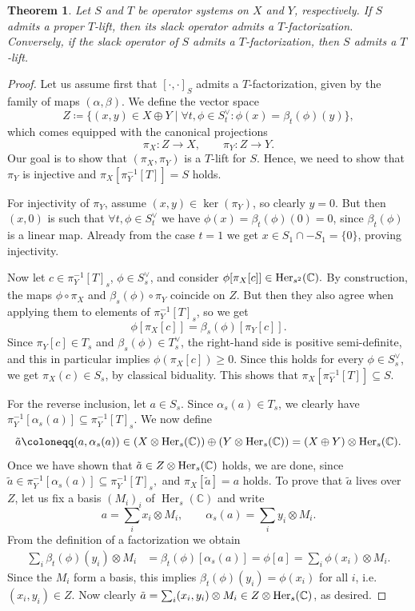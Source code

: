 \documentclass[11pt,onecolumn]{article}
\theoremstyle{plain}
\newtheorem{theorem}{Theorem}[section]
\theoremstyle{definition}
\newcommand{\C}{\mathbb{C}}
\begin{document}
\begin{theorem} \label{thm:NC_lift_iff_fact}
	Let \(S\) and \(T\) be operator systems on \(X\) and \(Y\), respectively. If \(S\) admits a proper \(T\)-lift, then its slack operator  admits a \(T\)-factorization. Conversely, if the slack operator of $S$ admits a \(T\)-factorization, then \(S\) admits a  \(T\)-lift.
\end{theorem}
\begin{proof}
	Let us assume first that \([\cdot,\cdot]_S\) admits a \(T\)-factorization, given by the family of maps \((\alpha, \beta)\). We define the vector space \[Z \coloneqq \lbrace (x, y) \in X \oplus Y \mid \forall t, \phi \in S^\lor_t\colon \phi(x) = \beta_t(\phi)(y) \rbrace,\] which comes equipped with the canonical projections \[\pi_X\colon Z \to X, \qquad \pi_Y\colon Z \to Y.\] Our goal is to show that \((\pi_X, \pi_Y)\) is a \(T\)-lift for \(S\). Hence, we need to show that $\pi_Y$ is injective and \(\pi_X[\pi_Y^{-1}[T]] = S\) holds. 

   For injectivity of $\pi_Y$, assume \((x, y) \in \operatorname{ker}(\pi_Y)\), so clearly \(y = 0\). But then \((x, 0)\) is such that \(\forall t, \phi \in S^\lor_t\) we have \(\phi(x) = \beta_t(\phi)(0) = 0\), since \(\beta_t(\phi)\) is a linear map. Already from the case $t=1$ we get  $x\in S_1\cap -S_1=\{0\}$, proving injectivity. 
	
    Now let \(c \in \pi_Y^{-1}[T]_s\), \(\phi \in S^\lor_s\), and consider \(\phi[\pi_X[c]]\in{\rm Her}_{s^2}(\C).\) By construction, the maps \(\phi \circ \pi_X\) and \(\beta_s(\phi) \circ \pi_Y\) coincide on \(Z\). But then they  also agree when applying them to elements of \(\pi_Y^{-1}[T]_s\), so we get \[\phi[\pi_X[c]] = \beta_s(\phi)[\pi_Y[c]].\] Since \(\pi_Y[c] \in T_s\) and \(\beta_s(\phi) \in T^\lor_s\), the right-hand side is positive semi-definite, and this in particular implies  $\phi(\pi_X[c])\geqslant 0.$ Since this holds for every \(\phi \in S^\lor_s\), we get $\pi_X(c)\in S_s$, by classical biduality. This shows that \(\pi_X[\pi_Y^{-1}[T]] \subseteq S\).
	
	For the reverse inclusion, let \(a \in S_s\). Since \(\alpha_s(a) \in T_s\), we clearly have $\pi_Y^{-1}[\alpha_s(a)] \subseteq \pi_Y^{-1}[T]_s.$ We now define $$\tilde{a} \coloneqq (a, \alpha_s(a))\in (X\otimes{\rm Her}_s(\C))\oplus(Y\otimes{\rm Her}_s(\C))=(X\oplus Y)\otimes{\rm Her}_s(\C).$$ Once we have shown that $\tilde a\in Z\otimes{\rm Her}_s(\C)$ holds, we are done, since  \(\tilde{a} \in \pi_Y^{-1}[\alpha_s(a)]\subseteq \pi_Y^{-1}[T]_s,\) and $\pi_X[\tilde a]=a$ holds. To prove that $\tilde a$ lives over $Z$, let us fix a basis \((M_i)_i\) of \(\operatorname{Her}_s(\C)\) and write \[a = \sum_i x_i \otimes M_i, \qquad \alpha_s(a) = \sum_i y_i \otimes M_i.\]  From the definition of a factorization we obtain \begin{align*}\sum_i\beta_t(\phi)(y_i)\otimes M_i&=\beta_t(\phi)[\alpha_s(a)]=\phi[a]=\sum_i\phi(x_i)\otimes M_i.\end{align*} Since the $M_i$ form a basis, this implies $\beta_t(\phi)(y_i)=\phi(x_i)$ for all $i$, i.e.\ $(x_i,y_i)\in Z.$ Now clearly $\tilde a=\sum_i (x_i,y_i)\otimes M_i\in Z\otimes{\rm Her}_s(\C)$, as desired.
	

\end{proof}
\end{document}
